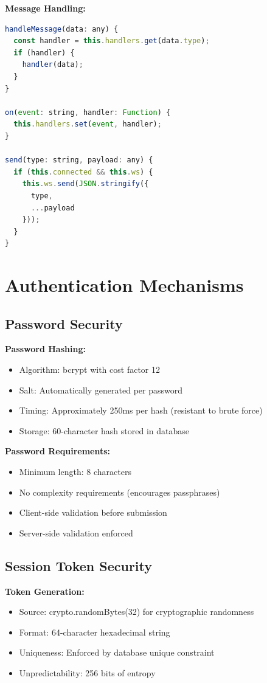 \textbf{Message Handling:}
\begin{lstlisting}[language=JavaScript]
handleMessage(data: any) {
  const handler = this.handlers.get(data.type);
  if (handler) {
    handler(data);
  }
}

on(event: string, handler: Function) {
  this.handlers.set(event, handler);
}

send(type: string, payload: any) {
  if (this.connected && this.ws) {
    this.ws.send(JSON.stringify({
      type,
      ...payload
    }));
  }
}
\end{lstlisting}

\section{Authentication Mechanisms}

\subsection{Password Security}

\textbf{Password Hashing:}
\begin{itemize}
    \item Algorithm: bcrypt with cost factor 12
    \item Salt: Automatically generated per password
    \item Timing: Approximately 250ms per hash (resistant to brute force)
    \item Storage: 60-character hash stored in database
\end{itemize}

\textbf{Password Requirements:}
\begin{itemize}
    \item Minimum length: 8 characters
    \item No complexity requirements (encourages passphrases)
    \item Client-side validation before submission
    \item Server-side validation enforced
\end{itemize}

\subsection{Session Token Security}

\textbf{Token Generation:}
\begin{itemize}
    \item Source: crypto.randomBytes(32) for cryptographic randomness
    \item Format: 64-character hexadecimal string
    \item Uniqueness: Enforced by database unique constraint
    \item Unpredictability: 256 bits of entropy
\end{itemize}


